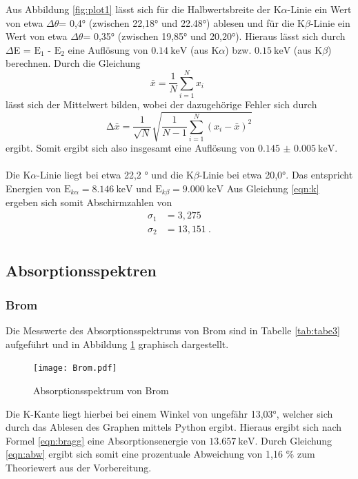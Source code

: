 Aus Abbildung \ref{fig:plot1} lässt sich für die Halbwertsbreite der K$\alpha$-Linie
ein Wert von etwa $\Delta \theta$= 0,4° (zwischen 22,18° und 22.48°) ablesen und für die K$\beta$-Linie ein
Wert von etwa $\Delta \theta$= 0,35° (zwischen 19,85° und 20,20°).
Hieraus lässt sich durch $\Delta$E = $\text{E}_1$ - $\text{E}_2$
eine Auflösung von $\SI{0.14}{\kilo\electronvolt}$ (aus K$\alpha$) bzw. $\SI{0.15}{\kilo\electronvolt}$
(aus K$\beta$) berechnen.
Durch die Gleichung
\begin{equation}
  \bar{x} = \frac{1}{N} \sum_{i=1}^{N} x_i \: \:
  \label{eqn:mit}
\end{equation}
\noindent lässt sich der Mittelwert bilden, wobei der dazugehörige Fehler sich durch
\begin{equation}
  \increment \bar{x} = \frac{1}{\sqrt{N}} \sqrt{ \frac{1}{N-1} \sum_{i=1}^N
  (x_i - \bar{x})^2}
  \label{eqn:mitf}
\end{equation}
ergibt.
Somit ergibt sich also insgesamt eine Auflösung von $\SI{0.145(5)}{\kilo\electronvolt}$.\\
\\



\noindent Die K$\alpha$-Linie liegt bei etwa 22,2 ° und die K$\beta$-Linie bei etwa 20,0°.
Das entspricht Energien von $\text{E}_{k\alpha} = \SI{8.146}{\kilo\electronvolt}$ und
$\text{E}_{k\beta} = \SI{9.000}{\kilo\electronvolt}$
Aus Gleichung \ref{eqn:k} ergeben sich somit Abschirmzahlen von
\begin{align*}
  \sigma_1 &= 3,275 \\
  \sigma_2 &= 13,151 \: . \\
\end{align*}

\subsection{Absorptionsspektren}
\subsubsection{Brom}
Die Messwerte des Absorptionsspektrums von Brom sind in Tabelle \ref{tab:tabe3} aufgeführt und
in Abbildung \ref{fig:brom} graphisch dargestellt.
\begin{figure}[H]
  \centering
  \texttt{[image: Brom.pdf]}
  \caption{Absorptionsspektrum von Brom}
  \label{fig:brom}
\end{figure}
Die K-Kante liegt hierbei bei einem Winkel von ungefähr 13,03°, welcher sich durch
das Ablesen des Graphen mittels Python ergibt. Hieraus ergibt sich nach Formel
\ref{eqn:bragg} eine Absorptionsenergie von $\SI{13.657}{\kilo\electronvolt}$. Durch Gleichung
\ref{eqn:abw} ergibt sich somit eine prozentuale Abweichung von 1,16 \%
zum Theoriewert aus der Vorbereitung.



